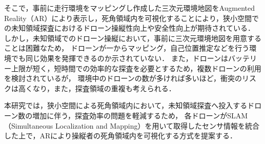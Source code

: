 \documentclass[a4paper,10pt,twocolumn,uplatex]{jsarticle}
\begin{document}
\par
そこで，事前に走行環境をマッピングし作成した三次元環境地図をAugmented Reality（AR）により表示し，死角領域内を可視化することにより，狭小空間での未知領域探査におけるドローン操縦性向上や安全性向上が期待されている\cite{Erat}．
しかし，未知領域でのドローン操縦において，事前に三次元環境地図を用意することは困難なため，
ドローンが一からマッピング，自己位置推定などを行う環境でも同じ効果を発揮できるのか示されていない．
また，ドローンはバッテリー上限が短く，短時間での効率的な探査を必要とするため\cite{Gupta}，複数ドローンの利用を検討されているが，
環境中のドローンの数が多ければ多いほど，衝突のリスクは高くなり，また，探査領域の重複も考えられる．

本研究では，狭小空間による死角領域内において，未知領域探査へ投入するドローン数の増加に伴う，探査効率の問題を軽減するため，
各ドローンがSLAM（Simultaneous Localization and Mapping）を用いて取得したセンサ情報を統合した上で，ARにより操縦者の死角領域内を可視化する方式を提案する．

\end{document}
